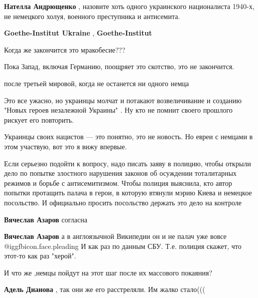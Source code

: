 \begin{itemize}
\begin{itemize}
\textbf{Нателла Андрющенко} , назовите хоть одного украинского националиста 1940-х, не немецкого холуя, военного преступника и антисемита.
\end{itemize} %

\textbf{Goethe-Institut Ukraine} , \textbf{Goethe-Institut}

Когда же закончится это мракобесие???

\begin{itemize} %
Пока Запад, включая Германию, поощряет это скотство, это не закончится.

после третьей мировой, когда не останется ни одного немца
\end{itemize} %


Это все ужасно, но украинцы молчат и потакают возвеличивание и созданию "Новых
героев незалежной Украины" . Ну кто не помнит своего прошлого рискует его
повторить.

\begin{itemize} %
Украинцы своих нацистов — это понятно, это не новость. Но евреи с немцами в этом участвую, вот это я вижу впервые.
\end{itemize} %


Если серьезно подойти к вопросу, надо писать заяву в полицию, чтобы открыли
дело по попытке злостного нарушения законов об осуждении тоталитарных режимов и
борьбе с антисемитизмом. Чтобы полиция выяснила, кто автор попытки протащить
палача в герои, в которую втянули мэрию Киева и немецкое посольство. И
официально просить посольство держать это дело на контроле

\begin{itemize} %
\textbf{Вячеслав Азаров} согласна

\textbf{Вячеслав Азаров} а в англоязычной Википедии он и не палач уже вовсе  @igg{fbicon.face.pleading} 
И как раз по данным СБУ. Т.е. полиция скажет, что этот-то как раз "херой".
\end{itemize} %

И что же ,немцы пойдут на этот шаг после их массового покаяния?

\begin{itemize} %
\textbf{Адель Дианова} , так они же его расстреляли. Им жалко стало(((


\end{itemize}
\end{itemize}
